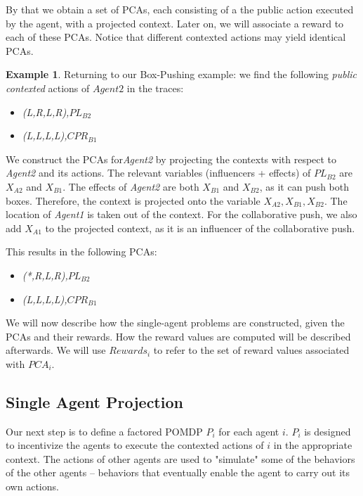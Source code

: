 \documentclass[letterpaper]{article} %
\theoremstyle{definition}
\newtheorem{example}{Example}
\newcommand{\eliran}[1]{\textbf{[\color{red}ELIRAN:#1]}}
\newcommand{\ronen}[1]{\textbf{[\color{blue}RONEN:#1]}}
\newcommand{\pcact}[1]{{\mathit{PCA}_#1}}
\begin{document}
By that we obtain a set of PCAs, each consisting of
a the public action executed by the agent, with a projected context.
Later on, we will associate a reward to each of these PCAs. Notice that   different contexted actions may yield identical PCAs.
\begin{example}
Returning to our Box-Pushing example: we find the following \emph{public contexted} actions of $Agent2$ in the traces:
\begin{itemize}
    \item \emph{(L,R,L,R),$PL_{B2}$}
    \item \emph{(L,L,L,L),$CPR_{B1}$}
\end{itemize}

We construct the PCAs for\emph{Agent2} by projecting the contexts with respect to \emph{Agent2} and its actions. The relevant variables (influencers + effects) of $PL_{B2}$ are $X_{A2}$ and $X_{B1}$. The effects of \emph{Agent2} are both $X_{B1}$ and $X_{B2}$, as it can push both boxes. Therefore, the context is projected onto the variable $X_{A2}, X_{B1}, X_{B2}$. The location of \emph{Agent1} is taken out of the context. 
For the collaborative push, we also add $X_{A1}$ to the projected context, as it is an influencer of the collaborative push.

This results in the following PCAs:
\begin{itemize}
    \item \emph{(*,R,L,R),$PL_{B2}$}
    \item \emph{(L,L,L,L),$CPR_{B1}$}
\end{itemize}
\end{example}

We will now describe how the single-agent problems are constructed, given the PCAs and their rewards.
How the reward values are computed will be described afterwards. We will use $Rewards_i$ to refer to the set
of reward values associated with $\pcact{i}$.





\subsection{Single Agent Projection}


Our next step is to define a factored POMDP $P_i$ for each agent $i$. $P_i$ is designed to incentivize the agents to execute the contexted actions of $i$ in the appropriate context.
The actions of other agents are used to "simulate" some of the behaviors of the other agents -- behaviors that eventually enable the agent to carry out its own actions.
\end{document}
